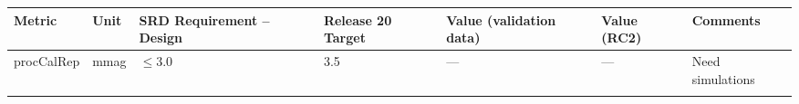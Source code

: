 \documentclass[DM,lsstdraft,toc]{lsstdoc}
\begin{document}
\begin{longtable}[]{@{}lllllll@{}}
\toprule
\begin{minipage}[b]{0.12\columnwidth}\raggedright\strut
Metric\strut
\end{minipage} & \begin{minipage}[b]{0.06\columnwidth}\raggedright\strut
Unit\strut
\end{minipage} & \begin{minipage}[b]{0.14\columnwidth}\raggedright\strut
SRD Requirement -- Design\strut
\end{minipage} & \begin{minipage}[b]{0.14\columnwidth}\raggedright\strut
Release 20 Target\strut
\end{minipage} & \begin{minipage}[b]{0.12\columnwidth}\raggedright\strut
Value (validation data)\strut
\end{minipage} & \begin{minipage}[b]{0.12\columnwidth}\raggedright\strut
Value (RC2) \strut
\end{minipage} & \begin{minipage}[b]{0.17\columnwidth}\raggedright\strut
Comments\strut
\end{minipage}\tabularnewline
\midrule
\endhead
\begin{minipage}[t]{0.12\columnwidth}\raggedright\strut
procCalRep\strut
\end{minipage} & \begin{minipage}[t]{0.06\columnwidth}\raggedright\strut
mmag\strut
\end{minipage} & \begin{minipage}[t]{0.14\columnwidth}\raggedright\strut
\(\leq 3.0\)\strut
\end{minipage} & \begin{minipage}[t]{0.14\columnwidth}\raggedright\strut
3.5\strut
\end{minipage} & \begin{minipage}[t]{0.12\columnwidth}\raggedright\strut
---\strut
\end{minipage} & \begin{minipage}[t]{0.12\columnwidth}\raggedright\strut
---\strut
\end{minipage} & \begin{minipage}[t]{0.17\columnwidth}\raggedright\strut
Need simulations\strut
\end{minipage}\tabularnewline
\begin{minipage}[t]{0.12\columnwidth}\raggedright\strut

\end{minipage}
\end{longtable}
\end{document}
